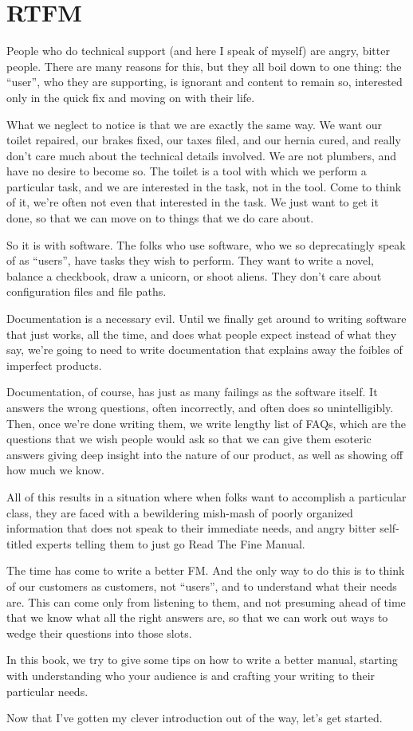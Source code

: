 \chapter{RTFM}

People who do technical support (and here I speak of myself)
are angry, bitter people. There are many
reasons for this, but they all boil down to one thing: the ``user'', who
they are supporting, is ignorant and content to remain so, interested
only in the quick fix and moving on with their life.

What we neglect to notice is that we are exactly the same way. We want
our toilet repaired, our brakes fixed, our taxes filed, and our hernia
cured, and really don't care much about the technical details involved.
We are not plumbers, and have no desire to become so. The toilet is a tool
with which we perform a particular task, and we are interested in the
task, not in the tool. Come to think of it, we're often not even that
interested in the task. We just want to get it done, so that we can move
on to things that we do care about.

So it is with software. The folks who use software, who we so
deprecatingly speak of as ``users'', have tasks they wish to perform.
They want to write a novel, balance a checkbook, draw a unicorn, or
shoot aliens. They don't care about configuration files and file paths.

Documentation is a necessary evil. Until we finally get around to
writing software that just works, all the time, and does what people
expect instead of what they say, we're going to need to write
documentation that explains away the foibles of imperfect products.

Documentation, of course, has just as many failings as the software
itself. It answers the wrong questions, often incorrectly, and often
does so unintelligibly. Then, once we're done writing them, we write
lengthy list of FAQs, which are the questions that we wish people would
ask so that we can give them esoteric answers giving deep insight into
the nature of our product, as well as showing off how much we know.

All of this results in a situation where when folks want to accomplish a
particular class, they are faced with a bewildering mish-mash of poorly
organized information that does not speak to their immediate needs, and
angry bitter self-titled experts telling them to just go Read The Fine
Manual.

The time has come to write a better FM. And the only way to do this is
to think of our customers as customers, not ``users'', and to understand
what their needs are. This can come only from listening to them, and not
presuming ahead of time that we know what all the right answers are, so
that we can work out ways to wedge their questions into those slots.

In this book, we try to give some tips on how to write a better manual,
starting with understanding who your audience is and crafting your
writing to their particular needs.

Now that I've gotten my clever introduction out of the way, let's get
started.
